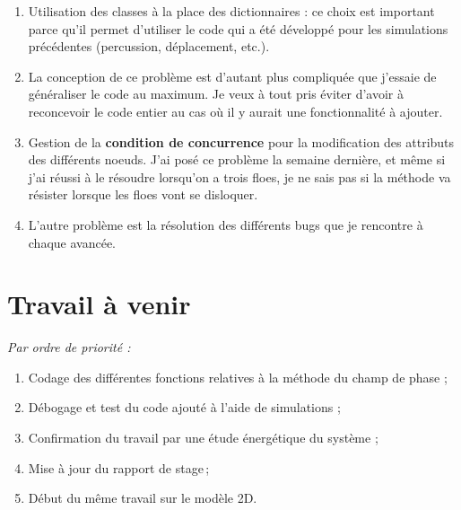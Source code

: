 \documentclass[
  french,
	11pt, %
]{fphw}
\begin{document}
\begin{enumerate}
  \item Utilisation des classes à la place des dictionnaires : ce choix est important parce qu'il permet d'utiliser le code qui a été développé pour les simulations précédentes (percussion, déplacement, etc.). 
  \item La conception de ce problème est d'autant plus compliquée que j'essaie de généraliser le code au maximum. Je veux à tout pris éviter d'avoir à reconcevoir le code entier au cas où il y aurait une fonctionnalité à ajouter.
  \item Gestion de la \textbf{condition de concurrence} pour la modification des attributs des différents noeuds. J'ai posé ce problème la semaine dernière, et même si j'ai réussi à le résoudre lorsqu'on a trois floes, je ne sais pas si la méthode va résister lorsque les floes vont se disloquer.
  \item L'autre problème est la résolution des différents bugs que je rencontre à chaque avancée.  
\end{enumerate} 





\section*{Travail à venir}

\emph{Par ordre de priorité :}

\begin{enumerate}
  \item Codage des différentes fonctions relatives à la méthode du champ de phase ;
  \item Débogage et test du code ajouté à l'aide de simulations ;
  \item Confirmation du travail par une étude énergétique du système ;
  \item Mise à jour du rapport de stage ;
  \item Début du même travail sur le modèle 2D.
\end{enumerate}



\clearpage   %
\printbibliography
\end{document}
